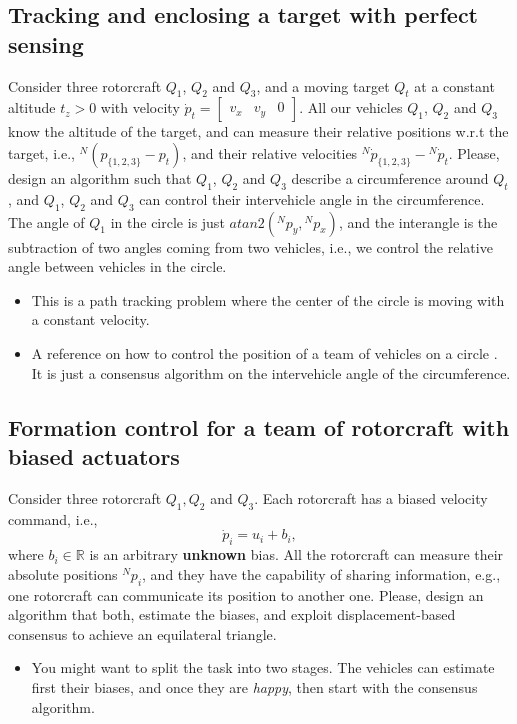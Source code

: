\documentclass[a4paper, onecolumn]{ieeeconf}
\begin{document}
\subsection{Tracking and enclosing a target with perfect sensing}
Consider three rotorcraft $Q_1$, $Q_2$ and $Q_3$, and a moving target $Q_t$ at a constant altitude $t_z > 0$ with velocity $\dot p_t = \begin{bmatrix}v_x & v_y & 0\end{bmatrix}$. All our vehicles $Q_1$, $Q_2$ and $Q_3$ know the altitude of the target, and can measure their relative positions w.r.t the target, i.e., $^N(p_{\{1,2,3\}} - p_t)$, and their relative velocities $^N\dot p_{\{1,2,3\}} - {^N\dot p_t}$. Please, design an algorithm such that $Q_1$, $Q_2$ and $Q_3$ describe a circumference around $Q_t$, and $Q_1$, $Q_2$ and $Q_3$ can control their intervehicle angle in the circumference. The angle of $Q_1$ in the circle is just $atan2({^Np}_y,{^Np}_x)$, and the interangle is the subtraction of two angles coming from two vehicles, i.e., we control the relative angle between vehicles in the circle.
	
\begin{itemize}
\item This is a path tracking problem where the center of the circle is moving with a constant velocity.
\item A reference on how to control the position of a team of vehicles on a circle \cite{iros17}. It is just a consensus algorithm on the intervehicle angle of the circumference.
\end{itemize}

\subsection{Formation control for a team of rotorcraft with biased actuators}
Consider three rotorcraft $Q_1, Q_2$ and $Q_3$. Each rotorcraft has a biased velocity command, i.e.,
\begin{equation}
\dot p_i = u_i + b_i,
\end{equation}
where $b_i\in\mathbb{R}$ is an arbitrary \textbf{unknown} bias. All the rotorcraft can measure their absolute positions $^Np_i$, and they have the capability of sharing information, e.g., one rotorcraft can communicate its position to another one. Please, design an algorithm that both, estimate the biases, and exploit displacement-based consensus to achieve an equilateral triangle.
\begin{itemize}
\item You might want to split the task into two stages. The vehicles can estimate first their biases, and once they are \emph{happy}, then start with the consensus algorithm.
\end{itemize}
 
\end{document}
